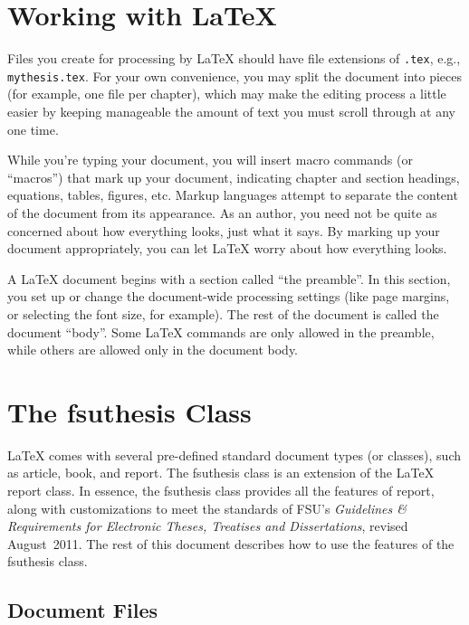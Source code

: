 \documentclass[11pt,letterpaper]{article}
\newcommand*{\booktitle}[1]{\textit{#1}}
\newcommand*{\complit}[1]{\texttt{#1}}
\newcommand*{\latexclass}[1]{\textsf{#1}}
\newcommand*{\fsuth}{\latexclass{fsuthesis}}
\renewcommand{\-}{\discretionary{}{}{}}
\begin{document}
\section{Working with \LaTeX{}}

Files you create for processing by \LaTeX{} should have file
extensions of \complit{.tex}, e.g., \complit{mythesis.tex}.  For your
own convenience, you may split the document into pieces (for example,
one file per chapter), which may make the editing process a little
easier by keeping manageable the amount of text you must scroll
through at any one time.

While you're typing your document, you will insert macro commands
(or ``macros'') that mark up your document, indicating chapter and
section headings, equations, tables, figures, etc.  Markup languages
attempt to separate the content of the document from its appearance.
As an author, you need not be quite as concerned about how everything
looks, just what it says.  By marking up your document appropriately,
you can let \LaTeX{} worry about how everything looks.

A \LaTeX{} document begins with a section called ``the preamble''.  In
this section, you set up or change the document-wide processing
settings (like page margins, or selecting the font size, for example).
The rest of the document is called the document ``body''.  Some
\LaTeX{} commands are only allowed in the preamble, while others are
allowed only in the document body.

\section{The \fsuth{} Class}

\label{sec:Class}
\LaTeX{} comes with several pre-defined standard document types (or
classes), such as \latexclass{article}, \latexclass{book}, and
\latexclass{report}.  The \fsuth{} class is an extension of the
\LaTeX{} \latexclass{report} class.  In essence, the \fsuth{}
class provides all the features of \latexclass{report}, along with
customizations to meet the standards of FSU's \booktitle{Guidelines \&
  Requirements for Electronic Theses, Treatises and Dissertations},
revised August~2011.  The rest of this document describes how to use
the features of the \fsuth{} class.

\subsection{Document Files}
\end{document}
